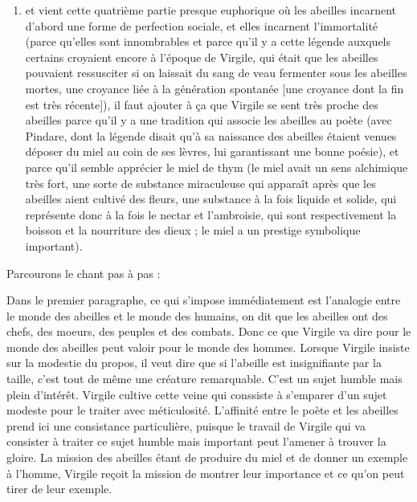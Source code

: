 \documentclass[a4paper,12pt]{book}
\begin{document}
\begin{enumerate}
\item et vient cette quatrième partie presque euphorique où les abeilles incarnent d'abord une forme de perfection sociale, et elles incarnent l'immortalité (parce qu'elles sont innombrables et parce qu'il y a cette légende auxquels certains croyaient encore à l'époque de Virgile, qui était que les abeilles pouvaient ressusciter si on laissait du sang de veau fermenter sous les abeilles mortes, une croyance liée à la génération spontanée [une croyance dont la fin est très récente]), il faut ajouter à ça que Virgile se sent très proche des abeilles parce qu'il y a une tradition qui associe les abeilles au poète (avec Pindare, dont la légende disait qu'à sa naissance des abeilles étaient venues déposer du miel au coin de ses lèvres, lui garantissant une bonne poésie), et parce qu'il semble apprécier le miel de thym (le miel avait un sens alchimique très fort, une sorte de substance miraculeuse qui apparaît après que les abeilles aient cultivé des fleurs, une substance à la fois liquide et solide, qui représente donc à la fois le nectar et l'ambroisie, qui sont respectivement la boisson et la nourriture des dieux ; le miel a un prestige symbolique important). \end{enumerate}
Parcourons le chant pas à pas :
\par Dans le premier paragraphe, ce qui s'impose immédiatement est l'analogie entre le monde des abeilles et le monde des humains, on dit que les abeilles ont des chefs, des moeurs, des peuples et des combats. Donc ce que Virgile va dire pour le monde des abeilles peut valoir pour le monde des hommes. Lorsque Virgile insiste sur la modestie du propos, il veut dire que si l'abeille est insignifiante par la taille, c'est tout de même une créature remarquable. C'est un sujet humble mais plein d'intérêt. Virgile cultive cette veine qui conssiste à s'emparer d'un sujet modeste pour le traiter avec méticulosité. L'affinité entre le poète et les abeilles prend ici une consistance particulière, puisque le travail de Virgile qui va consister à traiter ce sujet humble mais important peut l'amener à trouver la gloire. La mission des abeilles étant de produire du miel et de donner un exemple à l'homme, Virgile reçoit la mission de montrer leur importance et ce qu'on peut tirer de leur exemple.
\end{document}
